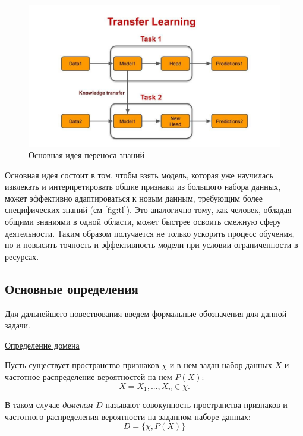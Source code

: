 \begin{figure}[h]
	\centering
	\includegraphics[width=\textwidth]{./images/tasks/TL_medium.jpg}
	\caption{Основная идея переноса знаний}
	\label{fig:tl}
\end{figure}

Основная идея состоит в том, чтобы взять модель, которая уже научилась извлекать и интерпретировать общие признаки из большого набора данных, может эффективно адаптироваться к новым данным, требующим более специфических знаний (см \autoref{fig:tl}). Это аналогично тому, как человек, обладая общими знаниями в одной области, может быстрее освоить смежную сферу деятельности. Таким образом получается не только ускорить процесс обучения, но и повысить точность и эффективность модели при условии ограниченности в ресурсах. 

\subsection{Основные определения}

Для дальнейшего повествования введем формальные обозначения для данной задачи.

\underline{Определение домена}

Пусть существует пространство признаков $\chi$ и в нем задан набор данных $X$ и частотное распределение вероятностей на нем $P(X)$:
\begin{equation}
	X = {X_1, ..., X_n} \in \chi.
\end{equation}

В таком случае \textit{доменом $D$} называют совокупность пространства признаков и частотного распределения вероятности на заданном наборе данных:
\begin{equation}
D = \{\chi, P(X)\}
\end{equation}

